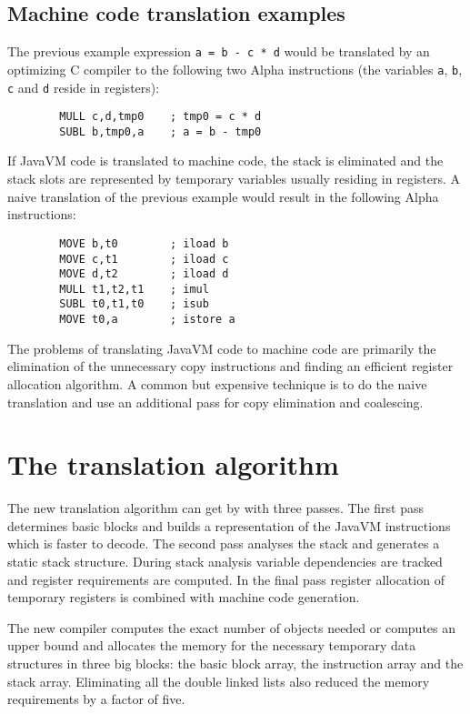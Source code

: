 \subsection{Machine code translation examples}

The previous example expression {\tt a = b - c * d} would be translated
by an optimizing C compiler to the following two Alpha instructions (the
variables {\tt a}, {\tt b}, {\tt c} and {\tt d} reside in registers):

\begin{verbatim}
        MULL c,d,tmp0    ; tmp0 = c * d
        SUBL b,tmp0,a    ; a = b - tmp0
\end{verbatim}

If JavaVM code is translated to machine code, the stack is eliminated and
the stack slots are represented by temporary variables usually residing in
registers. A naive translation of the previous example would result in the
following Alpha instructions:

\begin{verbatim}
        MOVE b,t0        ; iload b
        MOVE c,t1        ; iload c
        MOVE d,t2        ; iload d
        MULL t1,t2,t1    ; imul
        SUBL t0,t1,t0    ; isub
        MOVE t0,a        ; istore a
\end{verbatim}

The problems of translating JavaVM code to machine code are primarily the
elimination of the unnecessary copy instructions and finding an efficient
register allocation algorithm. A common but expensive technique is to do
the naive translation and use an additional pass for copy elimination and
coalescing.


\section{The translation algorithm}

The new translation algorithm can get by with three passes. The first pass
determines basic blocks and builds a representation of the JavaVM 
instructions which is faster to decode. The second pass analyses the stack
and generates a static stack structure. During stack analysis variable
dependencies are tracked and register requirements are computed. In the
final pass register allocation of temporary registers is combined with
machine code generation.

The new compiler computes the exact number of objects needed or computes an
upper bound and allocates the memory for the necessary temporary data
structures in three big blocks: the basic block array, the instruction
array and the stack array. Eliminating all the double linked lists also
reduced the memory requirements by a factor of five.


